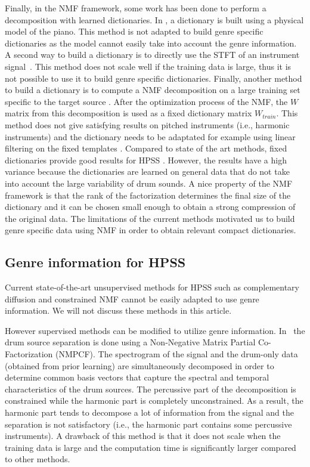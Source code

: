 \documentclass{article}
\begin{document}
Finally, in the NMF framework, some work has been done to perform a decomposition with learned dictionaries. In \cite{hennequin2011score}, a dictionary is built using a physical model of the piano. This method is not adapted to build genre specific dictionaries as the model cannot easily take into account the genre information. 
A second way to build a dictionary is to directly use the STFT of an instrument signal~\cite{wudrum}. This method does not scale well if the training data is large, thus it is not possible to use it to build genre specific dictionaries. 
Finally, another method to build a dictionary is to compute a NMF decomposition on a large training set specific to the target source \cite{schmidt2006single}. After the optimization process of the NMF, the $W$ matrix from this decomposition is used as a fixed dictionary matrix $W_{train}$. This method does not give satisfying results on pitched instruments (i.e., harmonic instruments) and the dictionary needs to be adaptated for example using linear filtering on the fixed templates \cite{jaureguiberry2011adaptation}. Compared to state of the art methods, fixed dictionaries provide good results for HPSS \cite{larocheJournal}. However, the results have a high variance because the dictionaries are learned on general data that do not take into account the large variability of drum sounds. A nice property of the NMF framework is that the rank of the factorization determines the final size of the dictionary and it can be chosen small enough to obtain a strong compression of the original data. The limitations of the current methods motivated us to build genre specific data using NMF in order to obtain relevant compact dictionaries. 
 

\subsection{Genre information for HPSS}

Current state-of-the-art unsupervised methods for HPSS such as complementary diffusion \cite{ono2008separation} and constrained NMF \cite{canadas2014percussive} cannot be easily adapted to use genre information. We will not discuss these methods in this article. 

However supervised methods can be modified to utilize genre information. In~\cite{kim2011nonnegative} the drum source separation is done using a Non-Negative Matrix Partial Co-Factorization (NMPCF). The spectrogram of the signal and the drum-only data (obtained from prior learning) are simultaneously decomposed in order to determine common basis vectors that capture the spectral and temporal characteristics of the drum sources. The percussive part of the decomposition is constrained while the harmonic part is completely unconstrained. As a result, the harmonic part tends to decompose a lot of information from the signal and the separation is not satisfactory (i.e., the harmonic part contains some percussive instruments). A drawback of this method is that it does not scale when the training data is large and the computation time is significantly larger compared to other methods.
\end{document}

